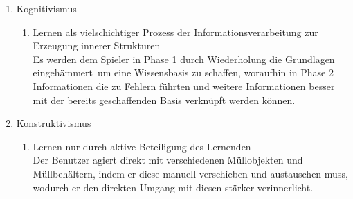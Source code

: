 \documentclass[a4paper]{article}
\begin{document}
\begin{enumerate}
\begin{enumerate}
\item Kognitivismus
  \begin{enumerate}
    \item Lernen als vielschichtiger Prozess der Informationsverarbeitung zur Erzeugung innerer Strukturen\\
   Es werden dem Spieler in Phase 1 durch Wiederholung die Grundlagen \glqq eingehämmert\grqq\ um eine Wissensbasis zu schaffen, woraufhin in Phase 2 Informationen die zu Fehlern führten und weitere Informationen besser mit der bereits geschaffenden Basis verknüpft werden können.
  \end{enumerate}

\item Konstruktivismus
  \begin{enumerate}
    \item Lernen nur durch aktive Beteiligung des Lernenden\\
    Der Benutzer agiert direkt mit verschiedenen Müllobjekten und Müllbehältern, indem er diese manuell verschieben und austauschen muss, wodurch er den direkten Umgang mit diesen stärker verinnerlicht.
  \end{enumerate}

\end{enumerate}


\end{enumerate}
\end{document}
